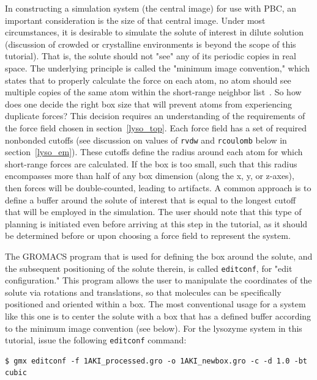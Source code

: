 \documentclass[9pt,tutorial,pubversion]{livecoms}
\begin{document}
In constructing a simulation system (the central image) for use with PBC, an important consideration is the size of that central image. Under most circumstances, it is desirable to simulate the solute of interest in dilute solution (discussion of crowded or crystalline environments is beyond the scope of this tutorial). That is, the solute should not "see" any of its periodic copies in real space. The underlying principle is called the "minimum image convention," which states that to properly calculate the force on each atom, no atom should see multiple copies of the same atom within the short-range neighbor list~\cite{Frenkel2001}. So how does one decide the right box size that will prevent atoms from experiencing duplicate forces? This decision requires an understanding of the requirements of the force field chosen in section~\ref{lyso_top}. Each force field has a set of required nonbonded cutoffs (see discussion on values of \texttt{rvdw} and \texttt{rcoulomb} below in section~\ref{lyso_em}). These cutoffs define the radius around each atom for which short-range forces are calculated. If the box is too small, such that this radius encompasses more than half of any box dimension (along the x, y, or z-axes), then forces will be double-counted, leading to artifacts. A common approach is to define a buffer around the solute of interest that is equal to the longest cutoff that will be employed in the simulation. The user should note that this type of planning is initiated even before arriving at this step in the tutorial, as it should be determined before or upon choosing a force field to represent the system.

The GROMACS program that is used for defining the box around the solute, and the subsequent positioning of the solute therein, is called \texttt{editconf}, for "edit configuration." This program allows the user to manipulate the coordinates of the solute via rotations and translations, so that molecules can be specifically positioned and oriented within a box. The most conventional usage for a system like this one is to center the solute with a box that has a defined buffer according to the minimum image convention (see below). For the lysozyme system in this tutorial, issue the following \texttt{editconf} command:

\begin{lstlisting}
$ gmx editconf -f 1AKI_processed.gro -o 1AKI_newbox.gro -c -d 1.0 -bt cubic
\end{lstlisting}
\end{document}

